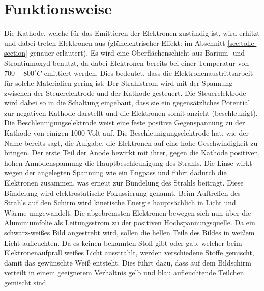 \section{Funktionsweise}
\label{sec:Funktionsweise}
Die Kathode, welche für das Emittieren der Elektronen zuständig ist, wird erhitzt und dabei treten Elektronen aus (glühelektrischer Effekt: im Abschnitt \ref{sec:tolle-section} genauer erläutert).
Es wird eine Oberflächenschicht aus Barium- und Strontiumoxyd benutzt, da  dabei Elektronen bereits bei einer Temperatur von $700-800 ^\circ C$ emittiert werden.
Dies bedeutet, dass die Elektronenaustrittsarbeit für solche Materialien gering ist.
Der Strahlstrom wird mit der Spannung zwischen der Steuerelektrode und der Kathode gesteuert.
Die Steuerelektrode wird dabei so in die Schaltung eingebaut, dass sie ein gegensätzliches Potential zur negativen Kathode darstellt und die Elektronen somit anzieht (beschleunigt).
Die Beschleunigungselektrode weist eine feste positive Gegenspannung zu der Kathode von einigen 1000 Volt auf. 
Die Beschleunigungselektrode hat, wie der Name bereits sagt, die Aufgabe, die Elektronen auf eine hohe Geschwindigkeit zu bringen.
Der erste Teil der Anode bewirkt mit ihrer, gegen die Kathode positiven, hohen Annodenspannung die Hauptbeschleunigung des Strahls.
Die Linse wirkt wegen der angelegten Spannung wie ein Engpass und führt dadurch die Elektronen zusammen, was erneut zur Bündelung des Strahls beiträgt.
Diese Bündelung wird elektrostatische Fokussierung genannt.
Beim Auftreffen des Strahls auf den Schirm wird kinetische Energie hauptsächlich in Licht und Wärme umgewandelt.
Die abgebremsten Elektronen bewegen sich nun über die Aluminiumfolie als Leitungsstrom zu der positiven Hochspannungsquelle.
Da ein schwarz-weißes Bild angestrebt wird, sollen die hellen Teile des Bildes in weißem Licht aufleuchten.
Da es keinen bekannten Stoff gibt oder gab, welcher beim Elektronenaufprall weißes Licht ausstrahlt, werden verschiedene Stoffe gemischt, damit das gewünschte Weiß entsteht.
Dies führt dazu, dass auf dem Bildschirm verteilt in einem geeignetem Verhältnis gelb und blau aufleuchtende Teilchen gemischt sind.


